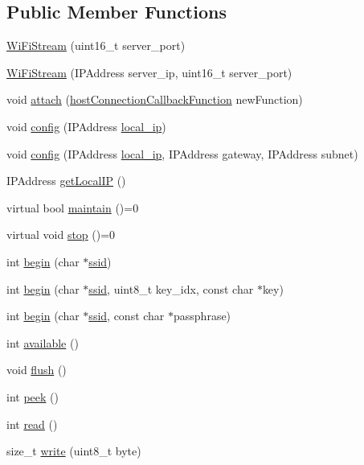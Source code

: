 \subsection*{Public Member Functions}
\begin{DoxyCompactItemize}
\item 
\hyperlink{class_wi_fi_stream_af287098c8a30dbdb4cdd39c39367339b}{Wi\+Fi\+Stream} (uint16\+\_\+t server\+\_\+port)
\item 
\hyperlink{class_wi_fi_stream_ac3eaf3da6000ade24eac3c029cad1062}{Wi\+Fi\+Stream} (I\+P\+Address server\+\_\+ip, uint16\+\_\+t server\+\_\+port)
\item 
void \hyperlink{class_wi_fi_stream_a4f279f8f5001c615002bf9043a0bc824}{attach} (\hyperlink{_wi_fi_stream_8h_ac590658d84d43947d605be50ab5fbc85}{host\+Connection\+Callback\+Function} new\+Function)
\item 
void \hyperlink{class_wi_fi_stream_a7ec6bca5a87c462e2402d12529e13207}{config} (I\+P\+Address \hyperlink{ethernet_config_8h_a2b4b74058584a3b553398a5e5e2f21c8}{local\+\_\+ip})
\item 
void \hyperlink{class_wi_fi_stream_a45e8232e467d643738e6a20b5bff909a}{config} (I\+P\+Address \hyperlink{ethernet_config_8h_a2b4b74058584a3b553398a5e5e2f21c8}{local\+\_\+ip}, I\+P\+Address gateway, I\+P\+Address subnet)
\item 
I\+P\+Address \hyperlink{class_wi_fi_stream_a8134646bad1d06f4ce61813cafb652ed}{get\+Local\+IP} ()
\item 
virtual bool \hyperlink{class_wi_fi_stream_ac7c0c7f36c7cf6b46bebafcbf6b1253b}{maintain} ()=0
\item 
virtual void \hyperlink{class_wi_fi_stream_a9438b7e07eae9f8a42af9060e7b330c7}{stop} ()=0
\item 
int \hyperlink{class_wi_fi_stream_a3aee2b1e2f93e2c6488051b249467254}{begin} (char $\ast$\hyperlink{wifi_config_8h_a375b545f86fd7e1d5d44926f28b75800}{ssid})
\item 
int \hyperlink{class_wi_fi_stream_ad6ac263500c511fad28e4fe8e286e65b}{begin} (char $\ast$\hyperlink{wifi_config_8h_a375b545f86fd7e1d5d44926f28b75800}{ssid}, uint8\+\_\+t key\+\_\+idx, const char $\ast$key)
\item 
int \hyperlink{class_wi_fi_stream_a9a37df8979690859e6c4c47752ecc785}{begin} (char $\ast$\hyperlink{wifi_config_8h_a375b545f86fd7e1d5d44926f28b75800}{ssid}, const char $\ast$passphrase)
\item 
int \hyperlink{class_wi_fi_stream_a238fc0fc25c4a9bda83e24257587dd64}{available} ()
\item 
void \hyperlink{class_wi_fi_stream_ad5a60c69e5aca993e90e8d02c0e9672c}{flush} ()
\item 
int \hyperlink{class_wi_fi_stream_a84ea0f80377001e0acf1385645ecaf1a}{peek} ()
\item 
int \hyperlink{class_wi_fi_stream_a238960bf0f7a3e3a7c60014a187fe577}{read} ()
\item 
size\+\_\+t \hyperlink{class_wi_fi_stream_a0a4dba3370af02570ef0d3429f1a6df2}{write} (uint8\+\_\+t byte)
\end{DoxyCompactItemize}
